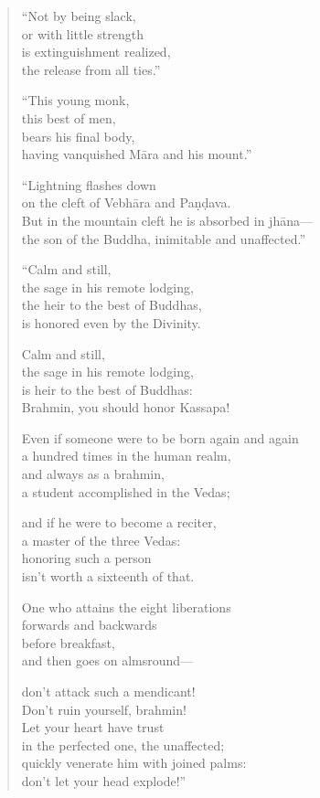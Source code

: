 \documentclass[12pt,openany]{book}%
\begin{document}
\begin{verse}
“Not by being slack, \\
or with little strength \\
is extinguishment realized, \\
the release from all ties.” 

“This young monk, \\
this best of men, \\
bears his final body, \\
having vanquished \textsanskrit{Māra} and his mount.” 

“Lightning flashes down \\
on the cleft of \textsanskrit{Vebhāra} and \textsanskrit{Paṇḍava}. \\
But in the mountain cleft he is absorbed in \textsanskrit{jhāna}—\\
the son of the Buddha, inimitable and unaffected.” 

“Calm and still, \\
the sage in his remote lodging, \\
the heir to the best of Buddhas, \\
is honored even by the Divinity. 

Calm and still, \\
the sage in his remote lodging, \\
is heir to the best of Buddhas: \\
Brahmin, you should honor Kassapa! 

Even if someone were to be born again and again \\
a hundred times in the human realm, \\
and always as a brahmin, \\
a student accomplished in the Vedas; 

and if he were to become a reciter, \\
a master of the three Vedas: \\
honoring such a person \\
isn’t worth a sixteenth of that. 

One who attains the eight liberations \\
forwards and backwards \\
before breakfast, \\
and then goes on almsround—

don’t attack such a mendicant! \\
Don’t ruin yourself, brahmin! \\
Let your heart have trust \\
in the perfected one, the unaffected; \\
quickly venerate him with joined palms: \\
don’t let your head explode!” 


\end{verse}
\end{document}
